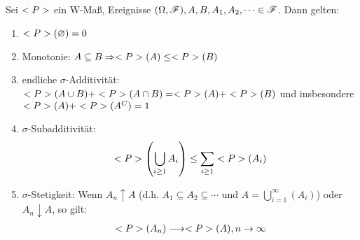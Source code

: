 \begin{proposition}
	Sei $<P>$ ein W-Maß, Ereignisse $(\Omega, \mathscr{F}), A, B, A_1, A_2, \dots \in \mathscr{F}$. Dann gelten:
	\begin{enumerate}
		\item $<P>(\varnothing) = 0$
		\item Monotonie: $A \subseteq B \Rightarrow <P>(A) \le <P>(B)$
		\item endliche $\sigma$-Additivität: $<P>(A\cup B) + <P>(A\cap B) = <P>(A) + <P>(B)$ und insbesondere $<P>(A) + <P>(A^C) = 1$
		\item $\sigma$-Subadditivität:
		\begin{align}
			<P>\left(\bigcup_{i \ge 1} A_i\right) \le \sum_{i \ge 1} <P>(A_i)\notag
		\end{align}
		\item $\sigma$-Stetigkeit: Wenn $A_n \uparrow A$ (d.h. $A_1 \subseteq A_2 \subseteq \cdots$ und $A = \bigcup_{i=1}^{\infty} (A_i)$) oder $A_n \downarrow A$, so gilt:
		\begin{align}
			<P>(A_n) \longrightarrow <P>(A), n \to \infty \notag
		\end{align}
	\end{enumerate}
\end{proposition}

